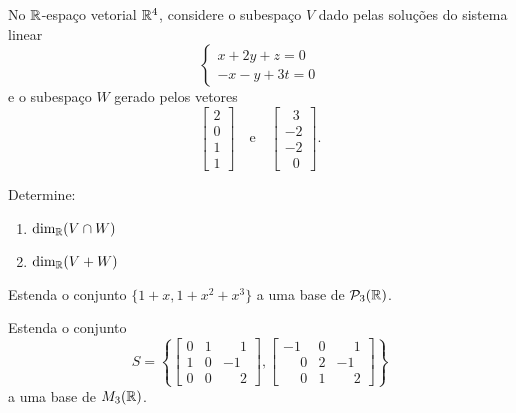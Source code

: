 \documentclass[12pt]{exam}
\begin{document}
    \begin{exercicio}
        No $\mathbb{R}$-espaço vetorial $\mathbb{R}^4$, considere o subespaço $V$ dado pelas soluç\~oes do sistema linear
        \[
            \begin{cases}
                x + 2y + z = 0\\
                -x -y + 3t = 0
            \end{cases}
        \]
        e o subespaço $W$ gerado pelos vetores
        \[
            \begin{bmatrix}
                2\\
                0\\
                1\\
                1
            \end{bmatrix} \quad \mbox{e}\quad
            \begin{bmatrix}
                \phantom{x} 3\\
                -2\\
                -2\\
                \phantom{x} 0
            \end{bmatrix}.
        \]

        Determine:
        \begin{enumerate}[label={\alph*})]
            \item $\dim_{\mathbb{R}}(V \cap W)$

            \item $\dim_{\mathbb{R}}(V + W)$
        \end{enumerate}
    \end{exercicio}

    \begin{exercicio}
        Estenda o conjunto $\{1 + x, 1 + x^2 + x^3\}$ a uma base de $\mathcal{P}_3(\mathbb{R})$.
    \end{exercicio}

    \begin{exercicio}
        Estenda o conjunto
        \[
        S = \left\{
        \begin{bmatrix}
            0 & 1 & \phantom{-} 1\\
            1 & 0 & -1\\
            0 & 0 & \phantom{-} 2
        \end{bmatrix},
        \begin{bmatrix}
            -1 & 0 & \phantom{-} 1\\
            \phantom{-} 0 & 2 & -1\\
            \phantom{-} 0 & 1 & \phantom{-} 2
        \end{bmatrix}
        \right\}
        \]
        a uma base de $M_3(\mathbb{R})$.
    \end{exercicio}
\end{document}

